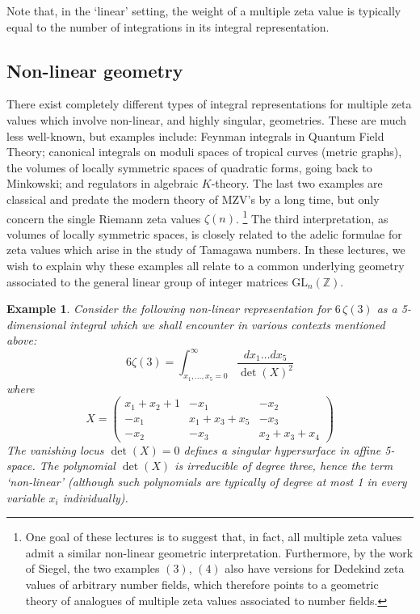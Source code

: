 \documentclass[12pt]{amsart}
\newcommand{\ZZ}{{\mathbb Z}}
\theoremstyle{plain}
\newtheorem{ex}[thm]{Example}
\newcommand{\GL}{\mathrm{GL}}
\newcommand{\0}{\color{blue}{\mathsf{0}}}
\begin{document}
Note that, in the  `linear' setting, the weight of a multiple zeta value  is typically equal to the  number of integrations in its  integral representation. 

\subsection{Non-linear geometry}There exist  completely different types of integral representations for multiple zeta values 
which involve   non-linear, and highly singular, geometries. These are much less well-known, but examples include:
 Feynman integrals in Quantum Field Theory; canonical integrals on moduli spaces of tropical curves (metric graphs), 
 the volumes of locally symmetric spaces of quadratic forms, going back to Minkowski; and  regulators in algebraic $K$-theory. 
The last two examples are   classical and predate the modern theory of MZV's by a long time, but  only concern the single Riemann zeta values $\zeta(n)$. \footnote{One goal of these lectures is to suggest that, in fact, all multiple zeta values admit a similar non-linear geometric interpretation.  Furthermore, by the work of Siegel, the  two examples $(3)$, $(4)$ also have versions  for Dedekind zeta values of arbitrary number fields,  which therefore points to a geometric  theory of analogues of  multiple zeta values associated to number fields. }
The third  interpretation, as volumes of locally symmetric spaces, is closely related to the adelic formulae for zeta values which arise in the study of Tamagawa numbers.
In these lectures, we wish   to explain why these  examples all relate to a common underlying geometry associated to  the general linear group of integer matrices $\GL_n(\ZZ)$. 

\begin{ex}  \label{exampleintrozeta3nonlinear} Consider the following non-linear representation for $ 6\, \zeta(3)$ as a 5-dimensional integral which we shall encounter in various  contexts mentioned above:
\[  6 \zeta (3)  = \int^{\infty}_{x_1,\ldots, x_5=0} \frac{dx_1 \ldots dx_5}{\det(X)^2} \] 
where  
\[   X = \begin{pmatrix}
 x_1+x_2+ 1  & -x_1  & - x_2  \\ 
 -x_1 & x_1+x_3+x_5 & -x_3 \\
 -x_2  & -x_3  & x_2+x_3+x_4  
\end{pmatrix}
\]
The  vanishing locus $\det(X)=0$ defines a singular hypersurface in affine 5-space. 
The polynomial $\det(X)$ is irreducible of degree three, hence the term `non-linear'  
(although such polynomials are typically  of degree at most 1 in every variable $x_i$  individually).  
\end{ex}
 
\end{document}
